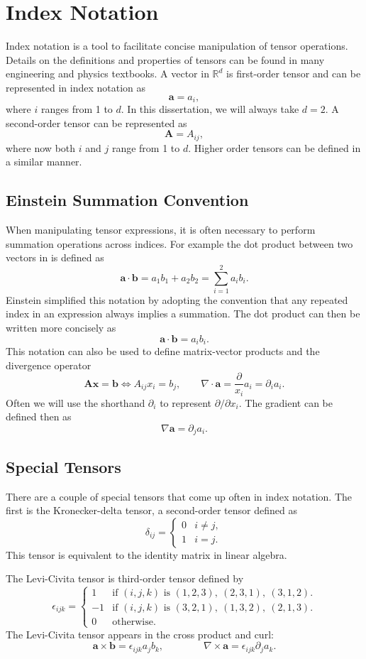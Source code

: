 \chapter{Index Notation}


Index notation is a tool to facilitate concise manipulation of tensor operations. Details on the definitions and properties of tensors can be found in many engineering and physics textbooks. A vector in $\mathbb{R}^d$  is first-order tensor and can be represented in index notation as
\[ \mathbf{a} = a_i, \]
where $i$ ranges from 1 to $d$. In this dissertation, we will always take $d=2$. A second-order tensor can be represented as
\[ \mathbf{A} = A_{ij},\]
where now both $i$ and $j$ range from 1 to $d$. Higher order tensors can be defined in a similar manner. 

\section{Einstein Summation Convention}

When manipulating tensor expressions, it is often necessary to perform summation operations across indices. For example the dot product between two vectors in  is defined as
\[ \mathbf{a}\cdot\mathbf{b} = a_1 b_1 + a_2 b_2 = \sum\limits_{i=1}^2 a_i b_i.\]
Einstein simplified this notation by adopting the convention that any repeated index in an expression always implies a summation. The dot product can then be written more concisely as 
\[ \mathbf{a}\cdot\mathbf{b} = a_i b_i.\]
This notation can also be used to define matrix-vector products and the divergence operator
\[ \mathbf{A}\mathbf{x} = \mathbf{b} \Leftrightarrow  A_{ij}x_i = b_j, \qquad \nabla\cdot\mathbf{a} = \frac{\partial}{x_i} a_i = \partial_i a_i. \]
Often we will use the shorthand $\partial_i$ to represent $\partial/\partial x_i$. The gradient can be defined then as
\[ \nabla \mathbf{a}  = \partial_j a_i.\]


\section{Special Tensors}

There are a couple of special tensors that come up often in index notation. The first is the Kronecker-delta tensor, a second-order tensor defined as
\[ \delta_{ij} = \begin{cases} 0 & i \ne j,\\ 1 & i = j.\end{cases}\]
This tensor is equivalent to the identity matrix in linear algebra. 

The Levi-Civita tensor is third-order tensor defined by
\[ \epsilon_{ijk} = \begin{cases} 1 & \text{if } (i,j,k) \text{ is } (1,2,3),~(2,3,1),~(3,1,2).\\
					-1 & \text{if }(i,j,k) \text{ is } (3,2,1),~(1,3,2),~(2,1,3).\\
					0 & \text{otherwise}.\end{cases}\]
The Levi-Civita tensor appears in the cross product and curl:
\[ \mathbf{a}\times\mathbf{b} = \epsilon_{ijk} a_j b_k, \qquad\qquad \nabla\times\mathbf{a} = \epsilon_{ijk}\partial_j a_k.\]
